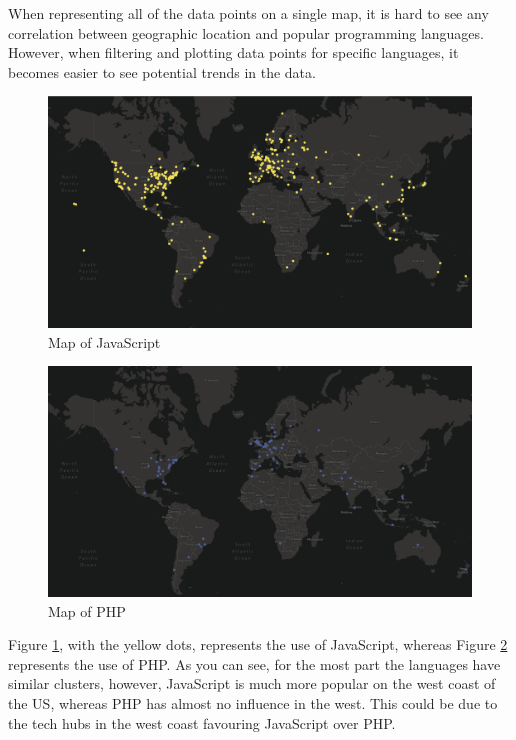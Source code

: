 \documentclass[11pt]{article}
\begin{document}
When representing all of the data points on a single map, it is hard to see any correlation between geographic location and popular programming languages. However, when filtering and plotting data points for specific languages, it becomes easier to see potential trends in the data.

\begin{figure}[H]
\centering
\includegraphics[scale=0.25]{JavaScript.png}
\caption{Map of JavaScript}
\label{fig:js}
\end{figure}

\begin{figure}[H]
\centering
\includegraphics[scale=0.25]{PHP.png}
\caption{Map of PHP}
\label{fig:php}
\end{figure}

Figure \ref{fig:js}, with the yellow dots, represents the use of JavaScript, whereas Figure \ref{fig:php} represents the use of PHP. As you can see, for the most part the languages have similar clusters, however, JavaScript is much more popular on the west coast of the US, whereas PHP has almost no influence in the west. This could be due to the tech hubs in the west coast favouring JavaScript over PHP.
\end{document}
